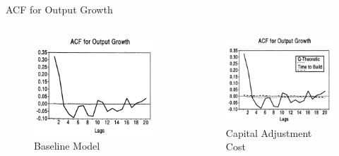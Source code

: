 \documentclass[10pt]{beamer}
\begin{document}
		      		\begin{frame}{ACF for Output Growth}
		      			\begin{columns}[T,onlytextwidth]
		      				\begin{figure}
		      					\centering
		      					\includegraphics[width=\linewidth]{figures/Bse_ACF.png}
		      					\caption{Baseline Model}
		      				\end{figure}
		      				
		      				\begin{figure}
		      					\centering
		      					\includegraphics[width=\linewidth]{figures/K_ACF.png}
		      					\caption{Capital Adjustment Cost}
		      				\end{figure}
		      				

\end{columns}
\end{frame}
\end{document}
